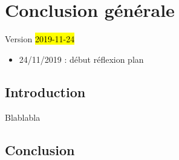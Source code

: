 \graphicspath{{chap7-Conclusion/}}



\chapter*{Conclusion générale}
\label{chap:conclu}
\begin{center}
{\large Version \hl{2019-11-24}}
\end{center}

\begin{itemize}
	\item 24/11/2019 : début réflexion plan
\end{itemize}
\setcounter{minitocdepth}{2}
\minitoc
\clearpage
{}


\section*{Introduction}
\label{sec:conclu-intro}

Blablabla

\section*{Conclusion}
\label{sec:conclu-conclu}
